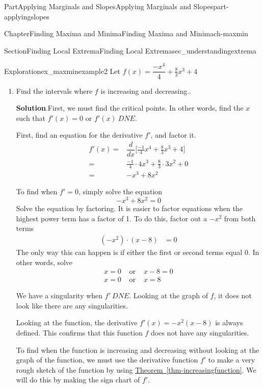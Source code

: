 \documentclass{tufte-book}
\newcommand{\blocktitlefont}{\relax}
\newcommand{\xreffont}{\relax}
\numberwithin{equation}{chapter}
\newcommand{\ddx}[1]{ \dfrac{d}{dx} \Big[ #1 \Big]  }
\newcommand{\amp}{&}
\begin{document}
\begin{partptx}{Part}{Applying Marginals and Slopes}{}{Applying Marginals and Slopes}{}{}{part-applyingslopes}
\begin{chapterptx}{Chapter}{Finding Maxima and Minima}{}{Finding Maxima and Minima}{}{}{ch-maxmin}
\begin{sectionptx}{Section}{Finding Local Extrema}{}{Finding Local Extrema}{}{}{sec_understandingextrema}
\begin{exploration}{Exploration}{}{ex_maxminexample2}
Let \(f(x) = \dfrac{-x^4}{4} + \frac{8}{3}x^3 + 4\)%
\begin{enumerate}[font=\bfseries,label=(\alph*),ref=\alph*]%
\item{}Find the intervals where \(f\) is increasing and decreasing..%
\par\smallskip%
\noindent\textbf{\blocktitlefont Solution}.\hypertarget{ex_maxminexample2-2-2}{}\quad{}First, we must find the critical points. In other words, find the \(x\) such that \(f'(x) =0\) or \(f'(x) \ DNE\).%
\par
First, find an equation for the derivative \(f'\), and factor it.%
\begin{align*}
f'(x) = \amp \ddx{ \frac{-1}{4} x^4 + \frac{8}{3} x^3 + 4   } \\
= \amp \frac{-1}{4}\cdot 4x^3 + \frac{8}{3} \cdot 3x^2 + 0 \\
= \amp -x^3 + 8x^2
\end{align*}
%
\par
To find when \(f'=0\), simply solve the equation%
\begin{equation*}
-x^3 + 8x^2     = 0
\end{equation*}
Solve the equation by factoring. It is easier to factor equations when the highest power term has a factor of 1. To do this, factor out a \(-x^2\) from both terms%
\begin{align*}
(-x^2) \cdot (x - 8) \amp =  0 
\end{align*}
The only way this can happen is if either the first or second terms equal 0.  In other words, solve%
\begin{align*}
x = 0 \amp \text{ or } \amp x-8=0 \\
x = 0 \amp \text{ or } \amp x=8   
\end{align*}
%
\par
We have a singularity when \(f'\ DNE\). Looking at the graph of \(f\), it does not look like there are any singularities.%
\par
Looking at the function, the derivative \(f'(x) = -x^2(x-8)\) is always defined. This confirms that this function \(f\) does not have any singularities.%
\par
To find when the function is increasing and decreasing without looking at the graph of the function, we must use  the derivative function \(f'\) to make a very rough sketch of the function by using \hyperref[thm-increasingfunction]{Theorem~{\xreffont\ref{thm-increasingfunction}}}. We will do this by making the sign chart of \(f'\).%
\par

\end{enumerate}
\end{exploration}
\end{sectionptx}
\end{chapterptx}
\end{partptx}
\end{document}
